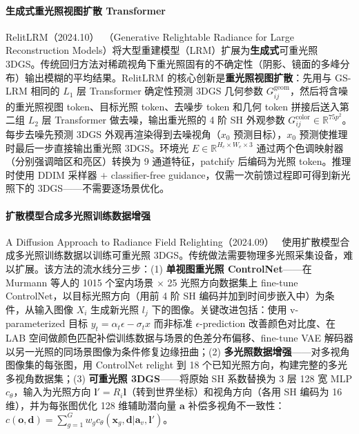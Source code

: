 \paragraph{生成式重光照视图扩散 Transformer}

RelitLRM（2024.10）~\cite{2410_06231}（Generative Relightable Radiance for Large Reconstruction Models）将大型重建模型（LRM）扩展为\textbf{生成式}可重光照 3DGS。传统回归方法对稀疏视角下重光照固有的不确定性（阴影、镜面的多峰分布）输出模糊的平均结果。RelitLRM 的核心创新是\textbf{重光照视图扩散}：先用与 GS-LRM 相同的 $L_1$ 层 Transformer 确定性预测 3DGS 几何参数 $G_{ij}^{\text{geom}}$，然后将含噪的重光照视图 token、目标光照 token、去噪步 token 和几何 token 拼接后送入第二组 $L_2$ 层 Transformer 做去噪，输出重光照的 4 阶 SH 外观参数 $G_{ij}^{\text{color}} \in \mathbb{R}^{75 p^2}$。每步去噪先预测 3DGS 外观再渲染得到去噪视角（$x_0$ 预测目标），$x_0$ 预测使推理时最后一步直接输出重光照 3DGS。环境光 $E \in \mathbb{R}^{H_e \times W_e \times 3}$ 通过两个色调映射器（分别强调暗区和亮区）转换为 9 通道特征，patchify 后编码为光照 token。推理时使用 DDIM 采样器 $+$ classifier-free guidance，仅需一次前馈过程即可得到新光照下的 3DGS——不需要逐场景优化。

\paragraph{扩散模型合成多光照训练数据增强}

A Diffusion Approach to Radiance Field Relighting（2024.09）~\cite{2409_08947} 使用扩散模型合成多光照训练数据以训练可重光照 3DGS。传统做法需要物理多光照采集设备，难以扩展。该方法的流水线分三步：(1) \textbf{单视图重光照 ControlNet}——在 Murmann 等人的 1015 个室内场景 $\times$ 25 光照方向数据集上 fine-tune ControlNet，以目标光照方向（用前 4 阶 SH 编码并加到时间步嵌入中）为条件，从输入图像 $X_i$ 生成新光照 $l_j$ 下的图像。关键改进包括：使用 v-parameterized 目标 $y_t = \alpha_t \epsilon - \sigma_t x$ 而非标准 $\epsilon$-prediction 改善颜色对比度、在 LAB 空间做颜色匹配补偿训练数据与场景的色差分布偏移、fine-tune VAE 解码器以另一光照的同场景图像为条件修复边缘扭曲；(2) \textbf{多光照数据增强}——对多视角图像集的每张图，用 ControlNet relight 到 18 个已知光照方向，构建完整的多光多视角数据集；(3) \textbf{可重光照 3DGS}——将原始 SH 系数替换为 3 层 128 宽 MLP $c_\theta$，输入为光照方向 $\mathbf{l}' = R_i \mathbf{l}$（转到世界坐标）和视角方向（各用 SH 编码为 16 维），并为每张图优化 128 维辅助潜向量 $\mathbf{a}$ 补偿多视角不一致性：$c(\mathbf{o}, \mathbf{d}) = \sum_{g=1}^{G} w_g c_\theta(\mathbf{x}_g, \mathbf{d} | \mathbf{a}_v, \mathbf{l}')$。

